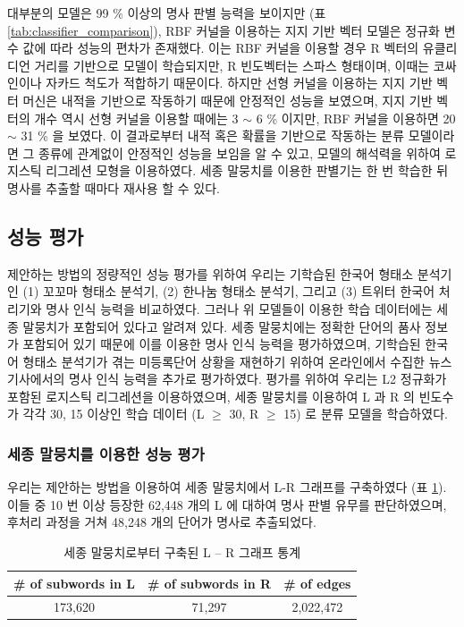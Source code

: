\documentclass[11pt]{article}
\begin{document}
대부분의 모델은 99 \% 이상의 명사 판별 능력을 보이지만 (표 \ref{tab:classifier_comparison}), RBF 커널을 이용하는 지지 기반 벡터 모델은 정규화 변수 값에 따라 성능의 편차가 존재했다.
이는 RBF 커널을 이용할 경우 R 벡터의 유클리디언 거리를 기반으로 모델이 학습되지만, R 빈도벡터는 스파스 형태이며, 이때는 코싸인이나 자카드 척도가 적합하기 때문이다.
하지만 선형 커널을 이용하는 지지 기반 벡터 머신은 내적을 기반으로 작동하기 때문에 안정적인 성능을 보였으며, 지지 기반 벡터의 개수 역시 선형 커널을 이용할 때에는 3 $\sim$ 6 \% 이지만, RBF 커널을 이용하면 20 $\sim$ 31 \%  을 보였다.
이 결과로부터 내적 혹은 확률을 기반으로 작동하는 분류 모델이라면 그 종류에 관계없이 안정적인 성능을 보임을 알 수 있고, 모델의 해석력을 위하여 로지스틱 리그레션 모형을 이용하였다.
세종 말뭉치를 이용한 판별기는 한 번 학습한 뒤 명사를 추출할 때마다 재사용 할 수 있다.


\subsection{성능 평가}

제안하는 방법의 정량적인 성능 평가를 위하여 우리는 기학습된 한국어 형태소 분석기인 (1) 꼬꼬마 형태소 분석기, (2) 한나눔 형태소 분석기, 그리고 (3) 트위터 한국어 처리기와 명사 인식 능력을 비교하였다.
그러나 위 모델들이 이용한 학습 데이터에는 세종 말뭉치가 포함되어 있다고 알려져 있다.
세종 말뭉치에는 정확한 단어의 품사 정보가 포함되어 있기 때문에 이를 이용한 명사 인식 능력을 평가하였으며, 기학습된 한국어 형태소 분석기가 겪는 미등록단어 상황을 재현하기 위하여 온라인에서 수집한 뉴스 기사에서의 명사 인식 능력을 추가로 평가하였다.
평가를 위하여 우리는 L2 정규화가 포함된 로지스틱 리그레션을 이용하였으며, 세종 말뭉치를 이용하여 L 과 R 의 빈도수가 각각 30, 15 이상인 학습 데이터 (L $\geq$ 30, R $\geq$ 15) 로 분류 모델을 학습하였다.

\subsubsection{세종 말뭉치를 이용한 성능 평가}

우리는 제안하는 방법을 이용하여 세종 말뭉치에서 L-R 그래프를 구축하였다 (표 \ref{tab:sejong_statistics}).
이들 중 10 번 이상 등장한 62,448 개의 L 에 대하여 명사 판별 유무를 판단하였으며, 후처리 과정을 거쳐 48,248 개의 단어가 명사로 추출되었다.

\begin{table}[ht]
\centering
\caption{세종 말뭉치로부터 구축된 L – R 그래프 통계}
\label{tab:sejong_statistics}
\begin{tabular}{|c|c|c|}
\hline
\rowcolor[HTML]{EFEFEF} 
\# of subwords in L & \# of subwords in R & \# of edges \\ \hline
173,620 & 71,297 & 2,022,472   \\ \hline
\end{tabular}%
\end{table}
\end{document}
